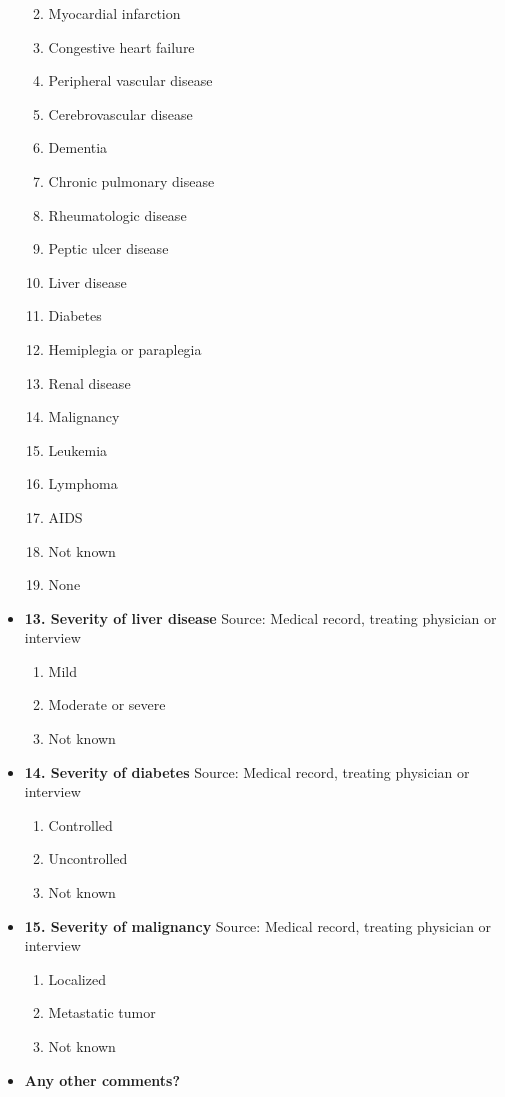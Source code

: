 \documentclass[
]{scrartcl}
\providecommand{\tightlist}{%
  \setlength{\itemsep}{0pt}\setlength{\parskip}{0pt}}\usepackage{longtable,booktabs,array}
\begin{document}
\begin{itemize}
  \begin{enumerate}
  \def\labelenumi{\arabic{enumi}.}
  \tightlist
  \item
    Myocardial infarction
  \item
    Congestive heart failure
  \item
    Peripheral vascular disease
  \item
    Cerebrovascular disease
  \item
    Dementia
  \item
    Chronic pulmonary disease
  \item
    Rheumatologic disease
  \item
    Peptic ulcer disease
  \item
    Liver disease
  \item
    Diabetes
  \item
    Hemiplegia or paraplegia
  \item
    Renal disease
  \item
    Malignancy
  \item
    Leukemia
  \item
    Lymphoma
  \item
    AIDS
  \item
    Not known
  \item
    None
  \end{enumerate}
\item
  \textbf{13. Severity of liver disease} Source: Medical record,
  treating physician or interview

  \begin{enumerate}
  \def\labelenumi{\arabic{enumi}.}
  \tightlist
  \item
    Mild
  \item
    Moderate or severe
  \item
    Not known
  \end{enumerate}
\item
  \textbf{14. Severity of diabetes} Source: Medical record, treating
  physician or interview

  \begin{enumerate}
  \def\labelenumi{\arabic{enumi}.}
  \tightlist
  \item
    Controlled
  \item
    Uncontrolled
  \item
    Not known
  \end{enumerate}
\item
  \textbf{15. Severity of malignancy} Source: Medical record, treating
  physician or interview

  \begin{enumerate}
  \def\labelenumi{\arabic{enumi}.}
  \tightlist
  \item
    Localized
  \item
    Metastatic tumor
  \item
    Not known
  \end{enumerate}
\item
  \textbf{Any other comments?}
\end{itemize}
\end{document}
